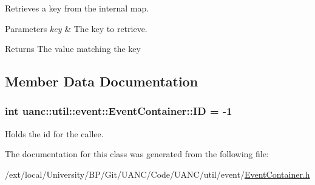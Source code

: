 Retrieves a key from the internal map. 


\begin{DoxyParams}{Parameters}
{\em key} & The key to retrieve. \\
\hline
\end{DoxyParams}
\begin{DoxyReturn}{Returns}
The value matching the key 
\end{DoxyReturn}


\subsection{Member Data Documentation}
\subsubsection[{\texorpdfstring{ID}{ID}}]{\setlength{\rightskip}{0pt plus 5cm}int uanc\+::util\+::event\+::\+Event\+Container\+::\+ID = -\/1}\hypertarget{classuanc_1_1util_1_1event_1_1_event_container_a27f819d0a217a8887c884cf2c69da4b7}{}\label{classuanc_1_1util_1_1event_1_1_event_container_a27f819d0a217a8887c884cf2c69da4b7}
Holds the id for the callee. 

The documentation for this class was generated from the following file\+:\begin{DoxyCompactItemize}
\item 
/ext/local/\+University/\+B\+P/\+Git/\+U\+A\+N\+C/\+Code/\+U\+A\+N\+C/util/event/\hyperlink{_event_container_8h}{Event\+Container.\+h}\end{DoxyCompactItemize}
